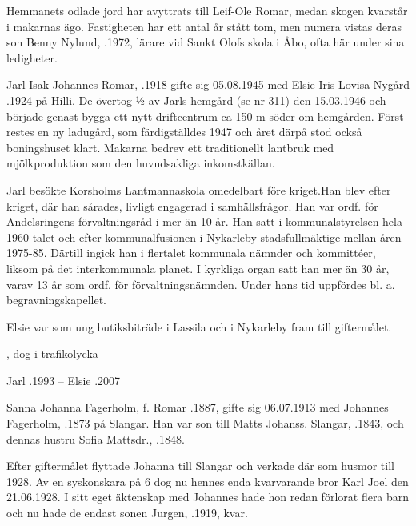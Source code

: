 Hemmanets odlade jord har avyttrats till Leif-Ole Romar, medan skogen kvarstår i makarnas ägo. Fastigheten har ett antal år stått tom, men numera vistas deras son Benny Nylund, .1972, lärare vid Sankt Olofs skola i  Åbo, ofta här under sina ledigheter.


Jarl Isak Johannes Romar, .1918 gifte sig 05.08.1945 med Elsie Iris Lovisa Nygård .1924 på Hilli. De övertog ½ av Jarls hemgård (se nr 311) den 15.03.1946 och började genast bygga ett nytt driftcentrum ca 150 m söder om hemgården. Först restes en ny ladugård, som färdigställdes 1947 och året därpå stod också boningshuset klart. Makarna bedrev ett traditionellt lantbruk med mjölkproduktion som den huvudsakliga inkomstkällan.

Jarl besökte Korsholms Lantmannaskola omedelbart före kriget.Han blev efter kriget, där han sårades, livligt engagerad i samhällsfrågor. Han var ordf. för Andelsringens förvaltningsråd i mer än 10 år. Han satt i kommunalstyrelsen hela 1960-talet och efter kommunalfusionen i Nykarleby stadsfullmäktige mellan åren 1975-85. Därtill ingick han i flertalet kommunala nämnder och kommittéer, liksom på det interkommunala planet. I kyrkliga organ satt han mer än 30 år, varav  13 år som ordf. för förvaltningsnämnden. Under hans tid uppfördes bl. a. begravningskapellet.

Elsie var som ung butiksbiträde i Lassila och i Nykarleby fram till giftermålet.
\begin{jhchildren}
  \item {}
  \item {}, dog i trafikolycka
\end{jhchildren}

Jarl .1993  --  Elsie .2007




Sanna Johanna Fagerholm, f. Romar .1887, gifte sig 06.07.1913 med Johannes Fagerholm, .1873 på Slangar. Han var son till Matts Johanss. Slangar, .1843, och dennas hustru Sofia Mattsdr., .1848.

Efter giftermålet flyttade Johanna till Slangar och verkade där som husmor till 1928. Av en syskonskara på 6 dog nu hennes enda kvarvarande bror Karl Joel den 21.06.1928. I sitt eget äktenskap med Johannes hade hon redan förlorat flera barn och nu hade de endast sonen Jurgen, .1919, kvar.

